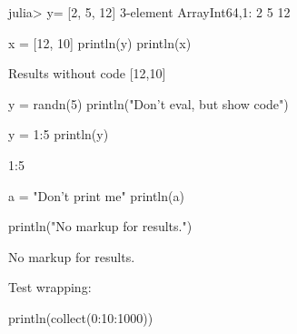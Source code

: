 

\begin{juliaterm}
julia> y= [2, 5, 12]
3-element Array{Int64,1}:
  2
  5
 12

\end{juliaterm}



\begin{juliacode}
x = [12, 10]
println(y)
println(x)
\end{juliacode}
\begin{juliaout}
[2,5,12]
[12,10]
\end{juliaout}




\begin{juliaout}
Results without code
[12,10]
\end{juliaout}




\begin{juliacode}
y = randn(5)
println("Don't eval, but show code")
\end{juliacode}



\begin{juliacode}
y = 1:5
println(y)
\end{juliacode}
\begin{juliaout}
1:5
\end{juliaout}



\begin{juliacode}
a = "Don't print me"
println(a)
\end{juliacode}



\begin{juliacode}
println("No markup for results.")
\end{juliacode}


No markup for results.




Test wrapping:

\begin{juliacode}
println(collect(0:10:1000))
\end{juliacode}
\begin{juliaout}
[0,10,20,30,40,50,60,70,80,90,100,110,120,130,140,150,160,170,180,190,200,2
10,220,230,240,250,260,270,280,290,300,310,320,330,340,350,360,370,380,390,
400,410,420,430,440,450,460,470,480,490,500,510,520,530,540,550,560,570,580
,590,600,610,620,630,640,650,660,670,680,690,700,710,720,730,740,750,760,77
0,780,790,800,810,820,830,840,850,860,870,880,890,900,910,920,930,940,950,9
60,970,980,990,1000]
\end{juliaout}



